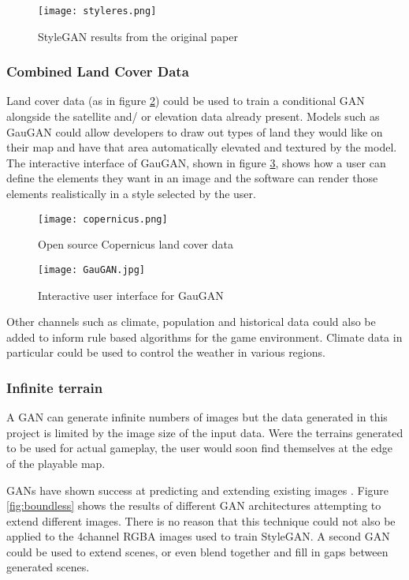 \documentclass[a4paper]{report}
\begin{document}
\begin{figure}[H]
    \centering
        \texttt{[image: styleres.png]}
        \caption{StyleGAN results from the original paper \cite{stylegan}}
        \label{fig:styleres}
\end{figure}

\subsubsection{Combined Land Cover Data}
Land cover data (as in figure \ref{fig:landCover}) could be used to train a conditional GAN alongside the satellite and/ or elevation data already present. Models such as GauGAN \cite{gauGAN} could allow developers to draw out types of land they would like on their map and have that area automatically elevated and textured by the model. The interactive interface of GauGAN, shown in figure \ref{fig:gauGAN}, shows how a user can define the elements they want in an image and the software can render those elements realistically in a style selected by the user.

\begin{figure}[H]
    \centering
        \texttt{[image: copernicus.png]}
        \caption{Open source Copernicus land cover data}
        \label{fig:landCover}
\end{figure}

\begin{figure}[H]
    \centering
        \texttt{[image: GauGAN.jpg]}
        \caption{Interactive user interface for GauGAN \cite{gauGAN}}
        \label{fig:gauGAN}
\end{figure}

Other channels such as climate, population and historical data could also be added to inform rule based algorithms for the game environment. Climate data in particular could be used to control the weather in various regions.

\subsubsection{Infinite terrain}
A GAN can generate infinite numbers of images but the data generated in this project is limited by the image size of the input data. Were the terrains generated to be used for actual gameplay, the user would soon find themselves at the edge of the playable map.

GANs have shown success at predicting and extending existing images \cite{boundless}. Figure \ref{fig:boundless} shows the results of different GAN architectures attempting to extend different images. There is no reason that this technique could not also be applied to the 4channel RGBA images used to train StyleGAN. A second GAN could be used to extend scenes, or even blend together and fill in gaps between generated scenes.
\end{document}
